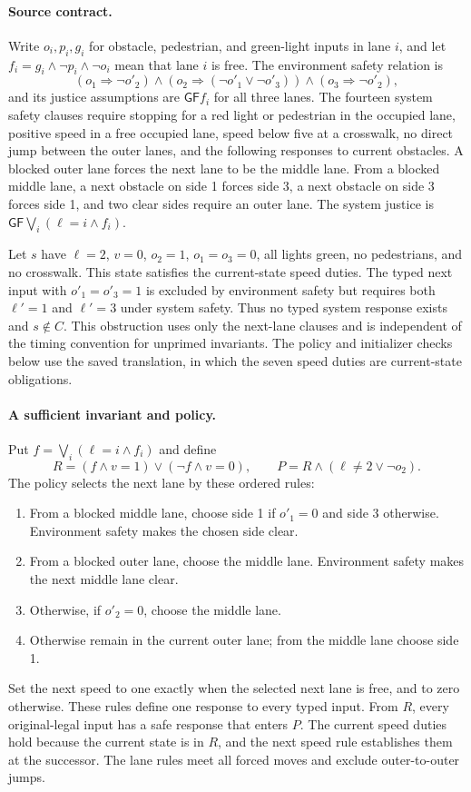 \paragraph{Source contract.}
Write $o_i,p_i,g_i$ for obstacle, pedestrian, and green-light inputs in
lane $i$, and let $f_i=g_i\land\neg p_i\land\neg o_i$ mean that lane
$i$ is free. The environment safety relation is
\[
 (o_1\Rightarrow\neg o'_2)\land
 (o_2\Rightarrow(\neg o'_1\lor\neg o'_3))\land
 (o_3\Rightarrow\neg o'_2),
\]
and its justice assumptions are $\mathsf{GF}f_i$ for all three lanes.
The fourteen system safety clauses require stopping for a red light or
pedestrian in the occupied lane, positive speed in a free occupied lane,
speed below five at a crosswalk, no direct jump between the outer lanes,
and the following responses to current obstacles. A blocked outer lane
forces the next lane to be the middle lane. From a blocked middle lane,
a next obstacle on side 1 forces side 3, a next obstacle on side 3
forces side 1, and two clear sides require an outer lane. The system
justice is $\mathsf{GF}\bigvee_i(\ell=i\land f_i)$.

Let $s$ have $\ell=2$, $v=0$, $o_2=1$, $o_1=o_3=0$, all lights green,
no pedestrians, and no crosswalk. This state satisfies the current-state
speed duties. The typed next input with $o'_1=o'_3=1$ is excluded by
environment safety but requires both $\ell'=1$ and $\ell'=3$ under
system safety. Thus no typed system response exists and $s\notin C$.
This obstruction uses only the next-lane clauses and is independent of
the timing convention for unprimed invariants. The policy and initializer
checks below use the saved translation, in which the seven speed duties
are current-state obligations.

\paragraph{A sufficient invariant and policy.}
Put $f=\bigvee_i(\ell=i\land f_i)$ and define
\[
 R=(f\land v=1)\lor(\neg f\land v=0),\qquad
 P=R\land(\ell\ne2\lor\neg o_2).
\]
The policy selects the next lane by these ordered rules:
\begin{enumerate}
\item From a blocked middle lane, choose side 1 if $o'_1=0$ and side 3
otherwise. Environment safety makes the chosen side clear.
\item From a blocked outer lane, choose the middle lane. Environment
safety makes the next middle lane clear.
\item Otherwise, if $o'_2=0$, choose the middle lane.
\item Otherwise remain in the current outer lane; from the middle lane
choose side 1.
\end{enumerate}
Set the next speed to one exactly when the selected next lane is free,
and to zero otherwise. These rules define one response to every typed
input. From $R$, every original-legal input has a safe response that
enters $P$. The current speed duties hold because the current state is
in $R$, and the next speed rule establishes them at the successor.
The lane rules meet all forced moves and exclude outer-to-outer jumps.

